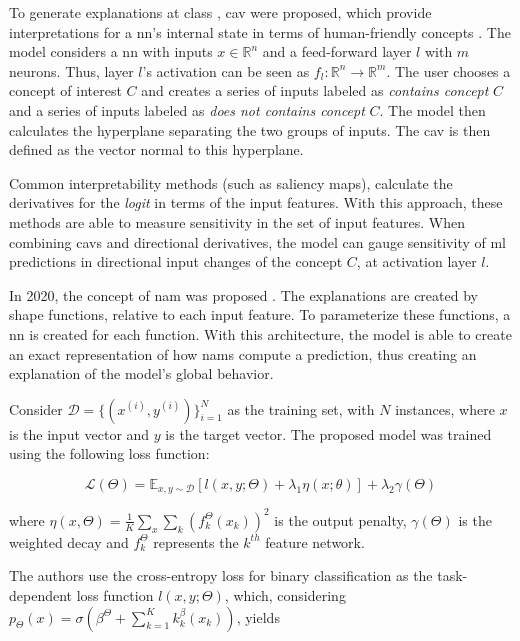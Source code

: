 To generate explanations at class , \gls{cav} were proposed, which provide interpretations for a \gls{nn}’s internal state in terms of human-friendly concepts \cite{TCAV}.
The model considers a \gls{nn} with inputs $x \in \mathbb{R}^n$ and a feed-forward layer $l$ with $m$ neurons. Thus, layer $l$'s activation can be seen as $f_l:\mathbb{R}^n \rightarrow \mathbb{R}^m$.
The user chooses a concept of interest $C$ and creates a series of inputs labeled as \textit{contains concept} $C$ and a series of inputs labeled as \textit{does not contains concept} $C$. The model then calculates the hyperplane separating the two groups of inputs. The \gls{cav} is then defined as the vector normal to this hyperplane. 

Common interpretability methods (such as saliency maps), calculate the derivatives for the \textit{logit} in terms of the input features. With this approach, these methods are able to measure sensitivity in the set of input features. When combining \gls{cav}s and directional derivatives, the model can gauge sensitivity of \gls{ml} predictions in directional input changes of the concept $C$, at activation layer $l$.

In 2020, the concept of \gls{nam} was proposed \cite{NAM}. The explanations are created by shape functions, relative to each input feature. To parameterize these functions, a \gls{nn} is created for each function. With this architecture, the model is able to create an exact representation of how \gls{nam}s compute a prediction, thus creating an explanation of the model's global behavior.

Consider $\mathcal{D} = \{(x^{(i)}, y^{(i)})\}_{i=1}^N$ as the training set, with $N$ instances, where $x$ is the input vector and $y$ is the target vector. The proposed model was trained using the following loss function:

\begin{equation}
\mathcal{L}(\Theta) = \mathds{E}_{x,y \sim \mathcal{D}} [l(x,y;\Theta) + \lambda_1\eta (x;\theta)] + \lambda_2 \gamma(\Theta)
\end{equation}

where $\eta(x,\Theta) = \frac{1}{K} \sum_x \sum_k (f_k^\Theta (x_k))^2$ is the output penalty, $\gamma(\Theta)$ is the weighted decay and $f_k^\Theta$ represents the $k^{th}$ feature network.

The authors use the cross-entropy loss for binary classification as the task-dependent loss function $l(x,y;\Theta)$, which, considering $p_\Theta(x) = \sigma(\beta^\Theta +  \sum_{k=1}^K k_k^\beta(x_k))$, yields  

